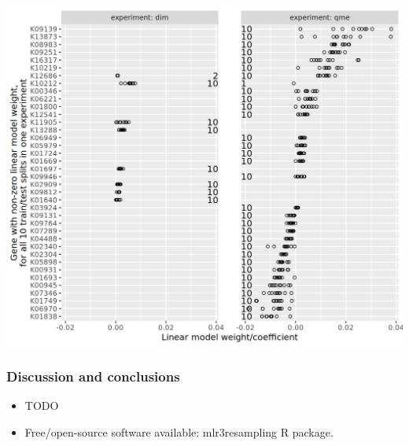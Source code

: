 \documentclass{beamer}
\begin{document}
\begin{frame}
  \includegraphics[width=\textwidth]{2024-01-09-qsip_pc2_all_new-controls.between.experiments.weights.png}
\end{frame}

\begin{frame}
  \frametitle{Discussion and conclusions}
  \begin{itemize}
  \item TODO
  \item Free/open-source software available: mlr3resampling R package.
  \end{itemize}
\end{frame}
\end{document}
